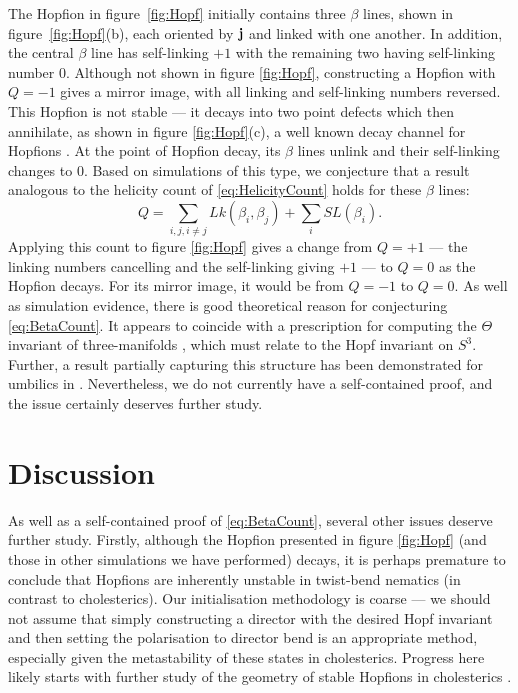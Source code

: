 {The Hopfion in figure~\ref{fig:Hopf} initially contains three $\beta$ lines, shown in figure~\ref{fig:Hopf}(b), each oriented by $\mathbf{j}$ and linked with one another. In addition, the central $\beta$ line has self-linking $+1$ with the remaining two having self-linking number $0$. Although not shown in figure \ref{fig:Hopf}, constructing a Hopfion with $Q=-1$ gives a mirror image, with all linking and self-linking numbers reversed. This Hopfion is not stable --- it decays into two point defects which then annihilate, as shown in figure \ref{fig:Hopf}(c), a well known decay channel for Hopfions \citep{Chuang1991}. At the point of Hopfion decay, its $\beta$ lines unlink and their self-linking changes to $0$. Based on simulations of this type, we conjecture that a result analogous to the helicity count of \eqref{eq:HelicityCount} holds for these $\beta$ lines:
\begin{equation}
    Q = \sum_{i,j, i\neq j}Lk(\beta_i,\beta_j) + \sum_{i} SL(\beta_i). 
    \label{eq:BetaCount}
\end{equation}
Applying this count to figure \ref{fig:Hopf} gives a change from $Q=+1$ --- the linking numbers cancelling and the self-linking giving $+1$ --- to $Q=0$ as the Hopfion decays. For its mirror image, it would be from $Q=-1$ to $Q=0$. As well as simulation evidence, there  is good theoretical reason for conjecturing \eqref{eq:BetaCount}. It appears to coincide with a prescription for computing the $\Theta$ invariant of three-manifolds \citep{Gompf1998}, which must relate to the Hopf invariant on $S^3$. Further, a result partially capturing this structure has been demonstrated for umbilics in \citep{Machon2016b}. Nevertheless, we do not currently have a self-contained proof, and the issue certainly deserves further study. 

\section{Discussion}
\label{sec:Discussion}

As well as a self-contained proof of \eqref{eq:BetaCount}, several other issues deserve further study. Firstly, although the Hopfion presented in figure \ref{fig:Hopf} (and those in other simulations we have performed) decays, it is perhaps premature to conclude that Hopfions are inherently unstable in twist-bend nematics (in contrast to cholesterics). Our initialisation methodology is coarse --- we should not assume that simply constructing a director with the desired Hopf invariant and then setting the polarisation to director bend is an appropriate method, especially given the metastability of these states in cholesterics. Progress here likely starts with further study of the geometry of stable Hopfions in cholesterics \citep{Ackerman2017}.

}
